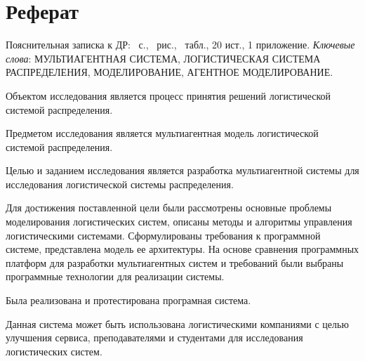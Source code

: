 \Russian
\section*{Реферат}
Пояснительная записка к ДР: \pageref{LastPage}~с., \totalfigures~рис., \totaltables~табл., 20 ист., 1 приложение. \bigbreak
\textit{Ключевые слова}: \MakeUppercase{мультиагентная система, логистическая система распределения, моделирование, агентное моделирование}. \bigbreak

Объектом исследования является процесс принятия решений логистической системой распределения.

Предметом исследования является мультиагентная модель  логистической системой распределения. 

Целью и заданием исследования является разработка мультиагентной системы для исследования логистической системы распределения.

Для достижения поставленной цели были рассмотрены основные проблемы моделирования логистических систем, описаны методы и алгоритмы управления логистическими системами.
Сформулированы требования к программной системе, представлена модель ее архитектуры.
На основе сравнения программных платформ для разработки мультиагентных систем и требований были выбраны программные технологии для реализации системы. 

Была реализована и протестирована програмная система.

Данная система может быть использована логистическими компаниями с целью улучшения сервиса, преподавателями и студентами для исследования логистических систем.

\Ukrainian
